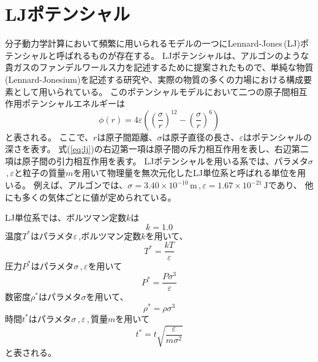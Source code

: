 \documentclass[titlepage]{jsreport}
\begin{document}
\section{LJポテンシャル}\label{principle-sec:LJ}
分子動力学計算において頻繁に用いられるモデルの一つにLennard-Jones\,(LJ)ポテンシャルと呼ばれるものが存在する。
LJポテンシャルは、アルゴンのような貴ガスのファンデルワールス力を記述するために提案された\cite{lennard-jones}もので、単純な物質(Lennard-Jonesium)を記述する研究\cite{lennard-jonesium-1,lennard-jonesium-2}や、実際の物質の多くの力場における構成要素\cite{lennard-jones-force-field-1,lennard-jones-force-field-2, lennard-jones-force-field-3}として用いられている。
このポテンシャルモデルにおいて二つの原子間相互作用ポテンシャルエネルギーは
\large
\begin{equation}
\phi(r)=4{\varepsilon}\left(\left(\frac{\sigma}{r}\right)^{12}-\left(\frac{\sigma}{r}\right)^6\right)\label{eq:lj}
\end{equation}
\normalsize
と表される。
ここで、$r$は原子間距離、${\sigma}$は原子直径の長さ、${\varepsilon}$はポテンシャルの深さを表す。
式(\ref{eq:lj})の右辺第一項は原子間の斥力相互作用を表し、右辺第二項は原子間の引力相互作用を表す。
LJポテンシャルを用いる系では、パラメタ$\sigma$\,,\,$\varepsilon$と粒子の質量$m$を用いて物理量を無次元化したLJ単位系と呼ばれる単位を用いる。
例えば、アルゴンでは、${\sigma}=3.40×10^{-10}\,\mathrm{m}$\,,\,${\varepsilon}=1.67×10^{-21}\,\mathrm{J}$であり\cite{lennard-jones-argon-parameters}、
他にも多くの気体ごとに値が定められている\cite{lennard-jones-many-parameters}。

LJ単位系では、ボルツマン定数$k$は
\large
\begin{equation}
k=1.0\label{eq:k}
\end{equation}
\normalsize
温度$T^*$はパラメタ$\varepsilon$\,,ボルツマン定数$k$を用いて、
\large
\begin{equation}
T^*=\frac{kT}{\varepsilon}\label{eq:T}
\end{equation}
\normalsize
圧力$P^*$はパラメタ${\sigma}$\,,\,${\varepsilon}$を用いて
\large
\begin{equation}
P^*=\frac{P\sigma^3}{\varepsilon}\label{eq:P}
\end{equation}
\normalsize
数密度$\rho^*$はパラメタ$\sigma$を用いて、
\large
\begin{equation}
\rho^*=\rho{\sigma}^3\label{eq:rho}
\end{equation}
\normalsize
時間$t^*$はパラメタ${\sigma}$\,,\,${\varepsilon}$\,,\,質量$m$を用いて
\large
\begin{equation}
t^*=t\sqrt{\frac{\varepsilon}{m{\sigma}^2}}\label{eq:time}
\end{equation}
\normalsize
と表される。
\end{document}
